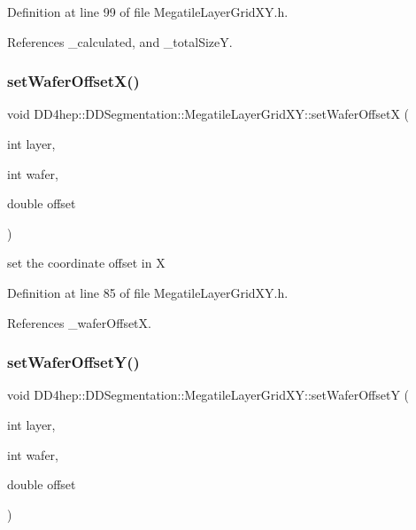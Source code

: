 Definition at line 99 of file Megatile\+Layer\+Grid\+X\+Y.\+h.



References \+\_\+calculated, and \+\_\+total\+SizeY.

\hypertarget{class_d_d4hep_1_1_d_d_segmentation_1_1_megatile_layer_grid_x_y_a8683c7d9ed5d4b02f79748d1bb16d935}{}\label{class_d_d4hep_1_1_d_d_segmentation_1_1_megatile_layer_grid_x_y_a8683c7d9ed5d4b02f79748d1bb16d935} 
\subsubsection{\texorpdfstring{set\+Wafer\+Offset\+X()}{setWaferOffsetX()}}
{\footnotesize\ttfamily void D\+D4hep\+::\+D\+D\+Segmentation\+::\+Megatile\+Layer\+Grid\+X\+Y\+::set\+Wafer\+OffsetX (\begin{DoxyParamCaption}\item[{int}]{layer,  }\item[{int}]{wafer,  }\item[{double}]{offset }\end{DoxyParamCaption})\hspace{0.3cm}{\ttfamily [inline]}}



set the coordinate offset in X 



Definition at line 85 of file Megatile\+Layer\+Grid\+X\+Y.\+h.



References \+\_\+wafer\+OffsetX.

\hypertarget{class_d_d4hep_1_1_d_d_segmentation_1_1_megatile_layer_grid_x_y_a4c17519c8f2abe47ea3b2a6d534871fa}{}\label{class_d_d4hep_1_1_d_d_segmentation_1_1_megatile_layer_grid_x_y_a4c17519c8f2abe47ea3b2a6d534871fa} 
\subsubsection{\texorpdfstring{set\+Wafer\+Offset\+Y()}{setWaferOffsetY()}}
{\footnotesize\ttfamily void D\+D4hep\+::\+D\+D\+Segmentation\+::\+Megatile\+Layer\+Grid\+X\+Y\+::set\+Wafer\+OffsetY (\begin{DoxyParamCaption}\item[{int}]{layer,  }\item[{int}]{wafer,  }\item[{double}]{offset }\end{DoxyParamCaption})\hspace{0.3cm}{\ttfamily [inline]}}



